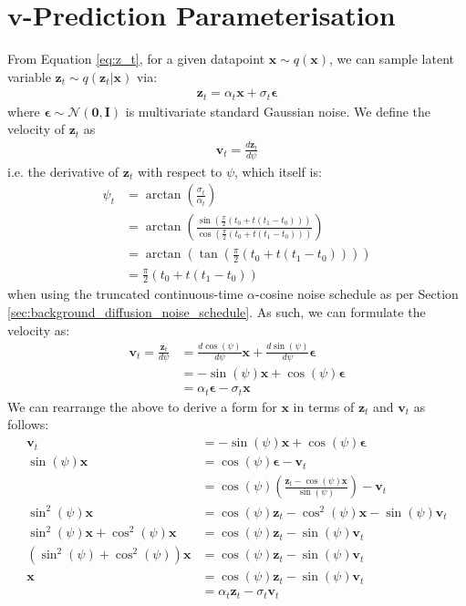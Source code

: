 \documentclass[ oneside,%
                    author={George Herbert},
                    degree={MSci},
                     title={Video Diffusion Models for Climate Simulations},
                  subtitle={}]{dissertation}
\begin{document}
\section{$\mathbf{v}$-Prediction Parameterisation}
\label{appx:diffusion_v_prediction_parameterisation}

From Equation \ref{eq:z_t}, for a given datapoint $\mathbf{x}\sim q(\mathbf{x})$, we can sample latent variable $\mathbf{z}_t\sim q(\mathbf{z}_t|\mathbf{x})$ via:
\begin{align}
      \mathbf{z}_t=\alpha_t\mathbf{x}+\sigma_t\boldsymbol\epsilon
\end{align}
where $\boldsymbol\epsilon\sim\mathcal{N}(\mathbf{0},\mathbf{I})$ is multivariate standard Gaussian noise. We define the velocity of $\mathbf{z}_t$ as
\begin{align}
      \mathbf{v}_t=\frac{d\mathbf{z}_t}{d \psi}
\end{align}
i.e. the derivative of $\mathbf{z}_t$ with respect to $\psi$, which itself is:
\begin{align}
      \psi_t&=\arctan\left(\frac{\sigma_t}{\alpha_t}\right)\\
      &=\arctan\left(\frac{\sin\left(\frac{\pi}{2}(t_0+t(t_1-t_0))\right)}{\cos\left(\frac{\pi}{2}(t_0+t(t_1-t_0))\right)}
      \right)\\
      &=\arctan\left(\tan\left(\frac{\pi}{2}(t_0+t(t_1-t_0))\right)\right)\\
      &=\frac{\pi}{2}(t_0+t(t_1-t_0))
\end{align}
when using the truncated continuous-time $\alpha$-cosine noise schedule as per Section \ref{sec:background_diffusion_noise_schedule}. As such, we can formulate the velocity as:
\begin{align}
      \mathbf{v}_t=\frac{\mathbf{z}_t}{d\psi}&=\frac{d\cos(\psi)}{d\psi}\mathbf{x}+\frac{d\sin(\psi)}{d\psi}\boldsymbol\epsilon\\
      &=-\sin(\psi)\mathbf{x}+\cos(\psi)\boldsymbol\epsilon\\
      &=\alpha_t\boldsymbol\epsilon-\sigma_t\mathbf{x}\label{eq:v_t_equals_alpha_t_epsilon_minus_sigma_t_x}
\end{align}
We can rearrange the above to derive a form for $\mathbf{x}$ in terms of $\mathbf{z}_t$ and $\mathbf{v}_t$ as follows:
\begin{align}
      \mathbf{v}_t&=-\sin(\psi)\mathbf{x}+\cos(\psi)\boldsymbol\epsilon\\
      \sin(\psi)\mathbf{x}&=\cos(\psi)\boldsymbol\epsilon-\mathbf{v}_t\\
      &=\cos(\psi)\left(\frac{\mathbf{z}_t-\cos(\psi)\mathbf{x}}{\sin(\psi)}\right)-\mathbf{v}_t\\
      \sin^2(\psi)\mathbf{x}&=\cos(\psi)\mathbf{z}_t-\cos^2(\psi)\mathbf{x}-\sin(\psi)\mathbf{v}_t\\
      \sin^2(\psi)\mathbf{x}+\cos^2(\psi)\mathbf{x}&=\cos(\psi)\mathbf{z}_t-\sin(\psi)\mathbf{v}_t\\
      (\sin^2(\psi)+\cos^2(\psi))\mathbf{x}&=\cos(\psi)\mathbf{z}_t-\sin(\psi)\mathbf{v}_t\\
      \mathbf{x}&=\cos(\psi)\mathbf{z}_t-\sin(\psi)\mathbf{v}_t\\
      &=\alpha_t\mathbf{z}_t-\sigma_t\mathbf{v}_t
\end{align}
\end{document}
